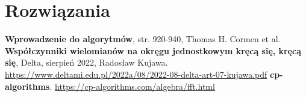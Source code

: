 \documentclass[11pt]{scrartcl}
\begin{document}
\section{Rozwiązania}
    \makeanswers

\begin{thebibliography}{9}
     \textbf{Wprowadzenie do algorytmów}, str. 920-940, Thomas H. Cormen et al.
     \textbf{Współczynniki wielomianów na okręgu jednostkowym kręcą się, kręcą się}, Delta, sierpień 2022, Radosław Kujawa.
        \url{https://www.deltami.edu.pl/2022a/08/2022-08-delta-art-07-kujawa.pdf}
     \textbf{cp-algorithms}.
        \url{https://cp-algorithms.com/algebra/fft.html}
\end{thebibliography}
\end{document}
